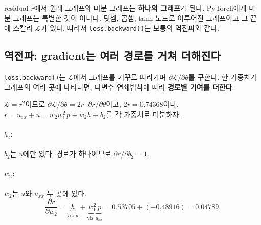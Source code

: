 \documentclass[11pt,a4paper]{article}
\newcommand{\loss}{\mathcal{L}}
\newcommand{\pd}[2]{\frac{\partial #1}{\partial #2}}
\begin{document}
\begin{keybox}
residual $r$에서 원래 그래프와 미분 그래프는 \textbf{하나의 그래프}가 된다.
PyTorch에게 미분 그래프는 특별한 것이 아니다. 덧셈, 곱셈, tanh 노드로 이루어진 그래프이고 그 끝에 스칼라 $\loss$가 있다.
따라서 \texttt{loss.backward()}는 보통의 역전파와 같다.
\end{keybox}

\subsection{역전파: gradient는 여러 경로를 거쳐 더해진다}\label{sec:backward}

\texttt{loss.backward()}는 $\loss$에서 그래프를 거꾸로 따라가며 $\partial\loss/\partial\theta$를 구한다.
한 가중치가 그래프의 여러 곳에 나타나면, 다변수 연쇄법칙에 따라 \textbf{경로별 기여를 더한다}.

$\loss=r^2$이므로 $\partial\loss/\partial\theta=2r\cdot\partial r/\partial\theta$이고, $2r=0.74368$이다.
$r=u_{xx}+u=w_2w_1^2\,p+w_2h+b_2$를 각 가중치로 미분하자.

\paragraph{$b_2$:} $b_2$는 $u$에만 있다. 경로가 하나이므로 $\partial r/\partial b_2=1$.

\paragraph{$w_2$:} $w_2$는 $u$와 $u_{xx}$ 두 곳에 있다.
\[
\pd{r}{w_2}=\underbrace{h}_{\text{via }u}+\underbrace{w_1^2\,p}_{\text{via }u_{xx}}=0.53705+(-0.48916)=0.04789.
\]
\end{document}
